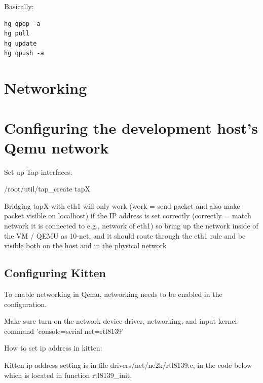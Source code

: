 \documentclass[11pt]{article}
\begin{document}
Basically:
\begin{verbatim}
hg qpop -a
hg pull
hg update
hg qpush -a
\end{verbatim}




\section{Networking}

\section{Configuring the development host's Qemu network}
Set up Tap interfaces:

/root/util/tap\_create tapX

Bridging tapX with eth1 will only work (work = send packet and also
make packet visible on localhost) if the IP address is set correctly
(correctly = match network it is connected to e.g., network of eth1)
so bring up the network inside of the VM / QEMU as 10-net, and it
should route through the eth1 rule and be visible both on the host and
in the physical network


\subsection{Configuring Kitten}

To enable networking in Qemu, networking needs to be enabled in the configuration.

Make sure turn on the network device driver, networking, and input
kernel command 'console=serial net=rtl8139'

How to set ip address in kitten:

Kitten ip address setting is in file drivers/net/ne2k/rtl8139.c, in the code below which is located in function rtl8139\_init.
\end{document}
